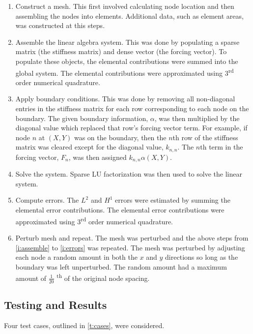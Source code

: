 \documentclass[a4paper, 12pt]{article}
\begin{document}
\begin{enumerate}
\item Construct a mesh. This first involved calculating node location
      and then assembling the nodes into elements. Additional data,
      such as element areas, was constructed at this steps.
\item Assemble the linear algebra system. This was done by populating a
      sparse matrix (the stiffness matrix) and dense vector (the forcing
      vector). To populate these objects, the elemental contributions
      were summed into the global system. The elemental contributions
      were approximated using 3\textsuperscript{rd} order numerical
      quadrature. \label{i:assemble}
\item Apply boundary conditions. This was done by removing
      all non-diagonal entries in the stiffness matrix for each row 
      corresponding to each node on the boundary. The given boundary
      information, $\alpha$, was then multiplied by the diagonal value
      which replaced that row's forcing vector term. For example, if 
      node $n$ at $(X, Y)$ was on the boundary, then the $n$th row
      of the stiffness matrix was cleared except for the 
      diagonal value, $k_{n,n}$. The $n$th term in the forcing vector,
      $F_n$, was then assigned $k_{n,n} \alpha( X, Y)$.
\item Solve the system. Sparse LU factorization was then used 
      to solve the linear system.
\item Compute errors. The $L^2$ and $H^1$ errors were estimated 
      by summing the elemental error contributions. The elemental
      error contributions were approximated using 3\textsuperscript{rd}
      order numerical quadrature. \label{i:errors}
\item Perturb mesh and repeat. The mesh was perturbed and the above steps
      from \ref{i:assemble} to \ref{i:errors} was repeated. 
      The mesh was perturbed by adjusting each node a random amount in 
      both the $x$ and $y$ directions so long as the boundary was 
      left unperturbed. The random amount had a maximum amount of 
      $\frac{1}{20}$ \textsuperscript{th} of the original node spacing.
\end{enumerate}

\subsection{Testing and Results} \label{ss:testAndResults}
Four test cases, outlined in \ref{t:cases}, were considered.
\end{document}
